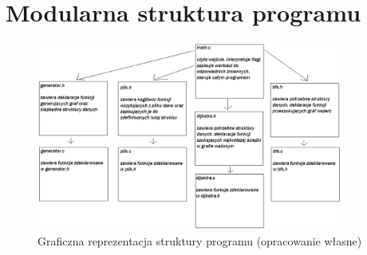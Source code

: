 \documentclass{article}
\begin{document}
\section{Modularna struktura programu}
\begin{figure}[htp]
\centering
\includegraphics[width=0.9\textwidth]{moduly_programu2.png}
\caption{\label{fig:mod}Graficzna reprezentacja struktury programu (opracowanie własne)}
\end{figure}
\end{document}
